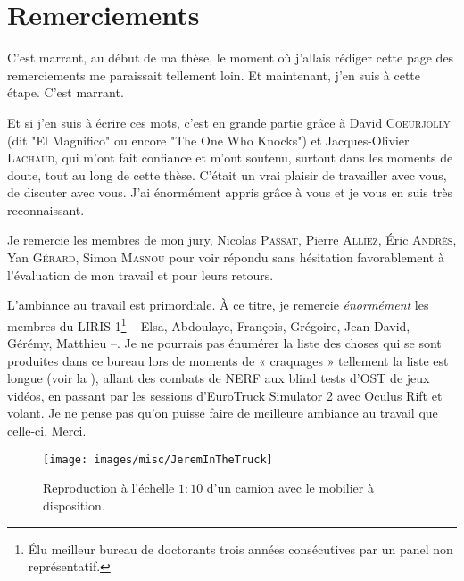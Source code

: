 \chapter*{Remerciements}
\label{sec:remerciements}
\vspace*{-10mm}


C'est marrant, au début de ma thèse, le moment où j'allais rédiger cette page
des remerciements me paraissait tellement loin. Et maintenant, j'en suis à cette
étape. C'est marrant.

Et si j'en suis à écrire ces mots, c'est en grande partie grâce à David
\textsc{Coeurjolly} (dit "El Magnifico" ou encore "The One Who Knocks") et Jacques-Olivier \textsc{Lachaud}, qui m'ont fait
confiance et m'ont soutenu, surtout dans les moments de doute, tout au long de
cette thèse. C'était un vrai plaisir de travailler avec vous, de discuter avec
vous. J'ai énormément appris grâce à vous et je vous en suis très reconnaissant.

Je remercie les membres de mon jury, Nicolas \textsc{Passat}, Pierre
\textsc{Alliez}, Éric \textsc{Andrès}, Yan \textsc{Gérard}, Simon
\textsc{Masnou} pour voir répondu sans hésitation favorablement à l'évaluation
de mon travail et pour leurs retours.

L'ambiance au travail est primordiale. À ce titre, je remercie \emph{énormément}
les membres du LIRIS-1\footnote{Élu meilleur bureau de doctorants trois années
consécutives par un panel non représentatif.} -- Elsa, Abdoulaye, François,
Grégoire, Jean-David, Gérémy, Matthieu --. Je ne pourrais pas énumérer la liste
des choses qui se sont produites dans ce bureau lors de moments de « craquages »
tellement la liste est longue (voir la ),
allant des combats de NERF aux blind tests d'OST de jeux vidéos, en passant par
les sessions d'EuroTruck Simulator 2 avec Oculus Rift et volant. Je ne pense pas
qu'on puisse faire de meilleure ambiance au travail que celle-ci. Merci.
%
\begin{figure}[ht]{
  \begin{center}
    \texttt{[image: images/misc/JeremInTheTruck]}
  \end{center}
  \caption{Reproduction à l'échelle $1:10$ d'un camion avec le mobilier à disposition.\label{fig:jerem-in-the-truck}}}
\end{figure}

